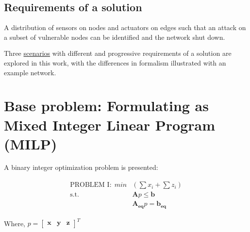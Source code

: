 \documentclass[authoryear,preprint,review,12pt]{elsarticle}
\begin{document}
\subsection{Requirements of a solution} %
A distribution of sensors on nodes and actuators on edges such
that an attack on a subset of vulnerable nodes can be identified and
the network shut down.

Three \hyperref[sec:Scenarios]{scenarios} with different and progressive requirements
of a solution are explored in this work, with the differences in formalism illustrated
with an example network.



\section{Base problem: Formulating as Mixed Integer Linear Program (MILP)}
A binary integer optimization problem is presented:

\begin{eqnarray}
\begin{aligned}
\text{PROBLEM I:}~~ min & (\sum x_{i}+\sum z_{i})\\
\text{s.t.}~& \mathbf{A}
p
 \leq \mathbf{b}\\
& \mathbf{A_{eq}}p =  \mathbf{b_{eq}}
\end{aligned}
\end{eqnarray}



Where, $  p=\begin{bmatrix}
 \mathbf{x} & \mathbf{y} & \mathbf{z} \end{bmatrix}^{T}$
\end{document}
